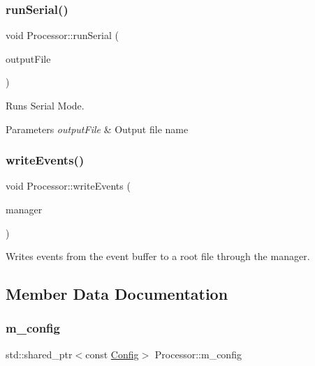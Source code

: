 \subsubsection{\texorpdfstring{run\+Serial()}{runSerial()}}
{\footnotesize\ttfamily void Processor\+::run\+Serial (\begin{DoxyParamCaption}\item[{const std\+::string}]{output\+File }\end{DoxyParamCaption})\hspace{0.3cm}{\ttfamily [private]}}



Runs Serial Mode. 


\begin{DoxyParams}{Parameters}
{\em output\+File} & Output file name \\
\hline
\end{DoxyParams}
\mbox{\label{class_processor_a1a19cb73f339992d6dd1be580c8efef0}} 
\subsubsection{\texorpdfstring{write\+Events()}{writeEvents()}}
{\footnotesize\ttfamily void Processor\+::write\+Events (\begin{DoxyParamCaption}\item[{std\+::unique\+\_\+ptr$<$ \hyperlink{class_event_tree_manager}{Event\+Tree\+Manager} $>$ \&}]{manager }\end{DoxyParamCaption})\hspace{0.3cm}{\ttfamily [private]}}



Writes events from the event buffer to a root file through the manager. 



\subsection{Member Data Documentation}
\mbox{\label{class_processor_ae6ebab331300f556a5c9b58d3dbfff60}} 
\subsubsection{\texorpdfstring{m\+\_\+config}{m\_config}}
{\footnotesize\ttfamily std\+::shared\+\_\+ptr$<$const \hyperlink{class_config}{Config}$>$ Processor\+::m\+\_\+config\hspace{0.3cm}{\ttfamily [private]}}



